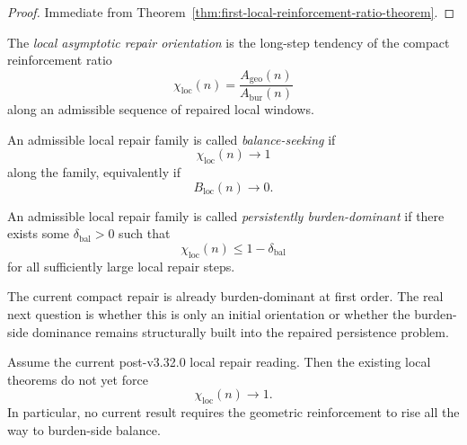 \begin{proof}
Immediate from Theorem~\ref{thm:first-local-reinforcement-ratio-theorem}.
\end{proof}


\begin{definition}
\label{def:local-asymptotic-repair-orientation}
The \emph{local asymptotic repair orientation} is the long-step tendency of the compact reinforcement ratio
\[
  \chi_{\mathrm{loc}}(n)
  =
  \frac{A_{\mathrm{geo}}(n)}{A_{\mathrm{bur}}(n)}
\]
along an admissible sequence of repaired local windows.
\end{definition}

\begin{definition}
\label{def:balance-seeking-local-repair-family}
An admissible local repair family is called \emph{balance-seeking} if
\[
  \chi_{\mathrm{loc}}(n)\to 1
\]
along the family, equivalently if
\[
  B_{\mathrm{loc}}(n)\to 0.
\]
\end{definition}

\begin{definition}
\label{def:persistently-burden-dominant-local-repair-family}
An admissible local repair family is called \emph{persistently burden-dominant} if there exists some \(\delta_{\mathrm{bal}}>0\) such that
\[
  \chi_{\mathrm{loc}}(n)\le 1-\delta_{\mathrm{bal}}
\]
for all sufficiently large local repair steps.
\end{definition}

\begin{remark}
\label{rem:why-the-asymptotic-question-matters}
The current compact repair is already burden-dominant at first order.
The real next question is whether this is only an initial orientation or whether the burden-side dominance remains structurally built into the repaired persistence problem.
\end{remark}

\begin{proposition}
\label{prop:current-line-does-not-yet-force-balance-seeking-behavior}
Assume the current post-v3.32.0 local repair reading.
Then the existing local theorems do not yet force
\[
  \chi_{\mathrm{loc}}(n)\to 1.
\]
In particular, no current result requires the geometric reinforcement to rise all the way to burden-side balance.
\end{proposition}

